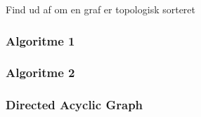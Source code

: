 Find ud af om en graf er topologisk sorteret
\subsubsection{Algoritme 1}


\subsubsection{Algoritme 2}


\subsubsection{Directed Acyclic Graph}
